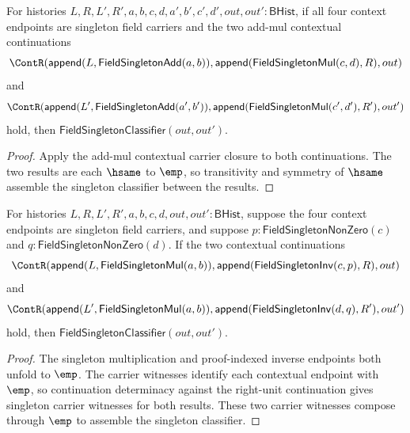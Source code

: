 \begin{theorem}
\label{thm:field-singleton-add-mul-context-continuation-classifier}
For histories
$L,R,L',R',a,b,c,d,a',b',c',d',out,out':\mathsf{BHist}$, if all four
context endpoints are singleton field carriers and the two add-mul contextual
continuations
$$
\ContR(\mathsf{append}(L,\mathsf{FieldSingletonAdd}(a,b)),
  \mathsf{append}(\mathsf{FieldSingletonMul}(c,d),R),out)
$$
and
$$
\ContR(\mathsf{append}(L',\mathsf{FieldSingletonAdd}(a',b')),
  \mathsf{append}(\mathsf{FieldSingletonMul}(c',d'),R'),out')
$$
hold, then $\mathsf{FieldSingletonClassifier}(out,out')$.
\end{theorem}
\begin{proof}
Apply the add-mul contextual carrier closure to both continuations. The two
results are each $\hsame$ to $\emp$, so transitivity and symmetry of $\hsame$
assemble the singleton classifier between the results.
\end{proof}

\begin{theorem}
\label{thm:field-singleton-mul-inv-context-continuation-classifier}
For histories $L,R,L',R',a,b,c,d,out,out':\mathsf{BHist}$, suppose the four
context endpoints are singleton field carriers, and suppose
$p:\mathsf{FieldSingletonNonZero}(c)$ and
$q:\mathsf{FieldSingletonNonZero}(d)$. If the two contextual continuations
$$
\ContR(\mathsf{append}(L,\mathsf{FieldSingletonMul}(a,b)),
  \mathsf{append}(\mathsf{FieldSingletonInv}(c,p),R),out)
$$
and
$$
\ContR(\mathsf{append}(L',\mathsf{FieldSingletonMul}(a,b)),
  \mathsf{append}(\mathsf{FieldSingletonInv}(d,q),R'),out')
$$
hold, then $\mathsf{FieldSingletonClassifier}(out,out')$.
\end{theorem}
\begin{proof}
The singleton multiplication and proof-indexed inverse endpoints both unfold
to $\emp$. The carrier witnesses identify each contextual endpoint with
$\emp$, so continuation determinacy against the right-unit continuation gives
singleton carrier witnesses for both results. These two carrier witnesses
compose through $\emp$ to assemble the singleton classifier.
\end{proof}


